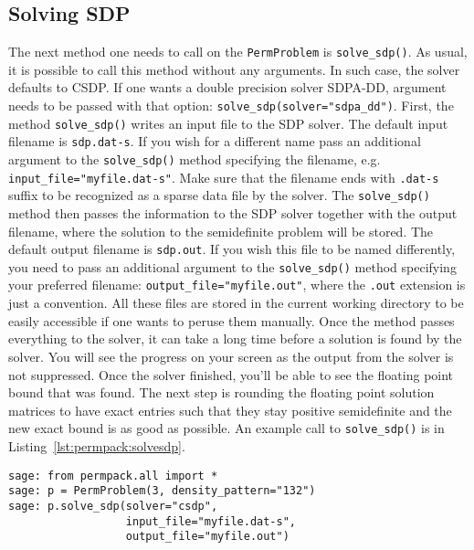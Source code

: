\subsection{Solving SDP}
The next method one needs to call on the \texttt{PermProblem} is \texttt{solve\_sdp()}. As usual, it is possible to call this method without any arguments. In such case, the solver defaults to CSDP. If one wants a double precision solver SDPA-DD, argument needs to be passed with that option: \texttt{solve\_sdp(solver="sdpa\_dd")}. First, the method \texttt{solve\_sdp()} writes an input file to the SDP solver. The default input filename is \texttt{sdp.dat-s}. If you wish for a different name pass an additional argument to the \texttt{solve\_sdp()} method specifying the filename, e.g. \texttt{input\_file="myfile.dat-s"}. Make sure that the filename ends with \texttt{.dat-s} suffix to be recognized as a sparse data file by the solver. The \texttt{solve\_sdp()} method then passes the information to the SDP solver together with the output filename, where the solution to the semidefinite problem will be stored. The default output filename is \texttt{sdp.out}. If you wish this file to be named differently, you need to pass an additional argument to the \texttt{solve\_sdp()} method specifying your preferred filename: \texttt{output\_file="myfile.out"}, where the \texttt{.out} extension is just a convention. All these files are stored in the current working directory to be easily accessible if one wants to peruse them manually. Once the method passes everything to the solver, it can take a long time before a solution is found by the solver. You will see the progress on your screen as the output from the solver is not suppressed. Once the solver finished, you'll be able to see the floating point bound that was found. The next step is rounding the floating point solution matrices to have exact entries such that they stay positive semidefinite and the new exact bound is as good as possible. An example call to \texttt{solve\_sdp()} is in Listing~\ref{lst:permpack:solvesdp}.

 {}
\begin{lstlisting}
sage: from permpack.all import *
sage: p = PermProblem(3, density_pattern="132")
sage: p.solve_sdp(solver="csdp",
                  input_file="myfile.dat-s",
                  output_file="myfile.out")
\end{lstlisting}

